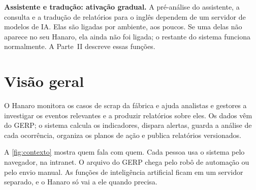 \begin{remark}[info]
\textbf{Assistente e tradução: ativação gradual.} A pré-análise do assistente, a
consulta e a tradução de relatórios para o inglês dependem de um servidor de modelos
de IA. Elas são ligadas por ambiente, aos poucos. Se uma delas não aparece no seu
Hanaro, ela ainda não foi ligada; o restante do sistema funciona normalmente. A
Parte~II descreve essas funções.
\end{remark}

\section{Visão geral}

O Hanaro monitora os casos de scrap da fábrica e ajuda analistas e gestores a
investigar os eventos relevantes e a produzir relatórios sobre eles. Os dados vêm do
GERP; o sistema calcula os indicadores, dispara alertas, guarda a análise de cada
ocorrência, organiza os planos de ação e publica relatórios versionados.

A \autoref{fig:contexto} mostra quem fala com quem. Cada pessoa usa o sistema pelo
navegador, na intranet. O arquivo do GERP chega pelo robô de automação ou pelo envio
manual. As funções de inteligência artificial ficam em um servidor separado, e o
Hanaro só vai a ele quando precisa.

